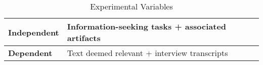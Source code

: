 \begin{table}[!h]
\centering    
\begin{threeparttable}
\begin{tabular}{l|l}



\hline

\textbf{Independent } & Information-seeking tasks + associated artifacts \\
\hline
\textbf{Dependent} & Text deemed relevant + interview transcripts \\
\hline

\end{tabular}
\end{threeparttable}
\caption{Experimental Variables}
\label{tbl:cp3-experiment-overview}
\end{table}

